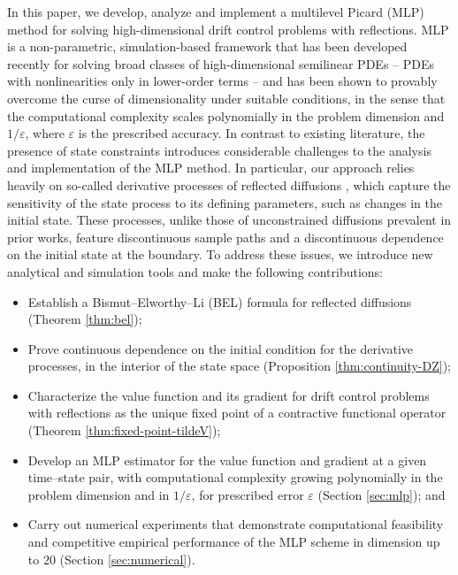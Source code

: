 \documentclass[11pt]{article}
\theoremstyle{definition}
\theoremstyle{plain}
\newcommand{\veps}{\varepsilon}
\begin{document}
In this paper, we develop, analyze and implement a multilevel Picard (MLP) method for solving high-dimensional drift control problems with reflections. 
MLP is a non-parametric, simulation-based framework that has been developed recently for solving broad classes of high-dimensional semilinear PDEs 
\cite{HutzenthalerJentzenKruse2019,HutzenthalerETAL2021,NeufeldNguyenWu2025,NeufeldWu2025,giles2019generalised,beck2020overcoming,becker2020numerical,hutzenthaler2019multilevel,hutzenthaler2021multilevel,hutzenthaler2022multilevel,hutzenthaler2022multilevel1,HJKN2020,HJKNW2020,NW2022}
 -- PDEs with nonlinearities only in lower-order terms -- 
and has been shown to provably overcome the curse of dimensionality under suitable conditions, 
in the sense that the computational complexity scales polynomially in the problem dimension and $1/\veps$, 
where $\veps$ is the prescribed accuracy. 
In contrast to existing literature, the presence of state constraints introduces considerable challenges to the analysis and implementation of the MLP method.
In particular, our approach relies heavily on so-called derivative processes of reflected diffusions \cite{LipshutzRamanan2018,LipshutzRamanan2019b}, 
which capture the sensitivity of the state process to its defining parameters, such as changes in the initial state. 
These processes, unlike those of unconstrained diffusions prevalent in prior works, 
feature discontinuous sample paths and a discontinuous dependence on the initial state at the boundary. 
To address these issues, we introduce new analytical and simulation tools and make the following contributions:
\begin{itemize}
  \item[(i)] Establish a Bismut--Elworthy--Li (BEL) formula for reflected diffusions (Theorem \ref{thm:bel}); %
  \item[(ii)] Prove continuous dependence on the initial condition for the derivative processes, in the interior of the state space (Proposition \ref{thm:continuity-DZ});
  \item[(iii)] Characterize the value function and its gradient for drift control problems with reflections as the unique fixed point of a contractive functional operator (Theorem \ref{thm:fixed-point-tildeV});
  \item[(iv)] Develop an MLP estimator for the value function and gradient at a given time--state pair, with computational complexity growing polynomially in the problem dimension and in $1/\veps$, for prescribed error $\veps$ (Section \ref{sec:mlp}); and
  \item[(v)] Carry out numerical experiments that demonstrate computational feasibility and competitive empirical performance of the MLP scheme in dimension up to $20$ (Section \ref{sec:numerical}).
\end{itemize}
\end{document}
